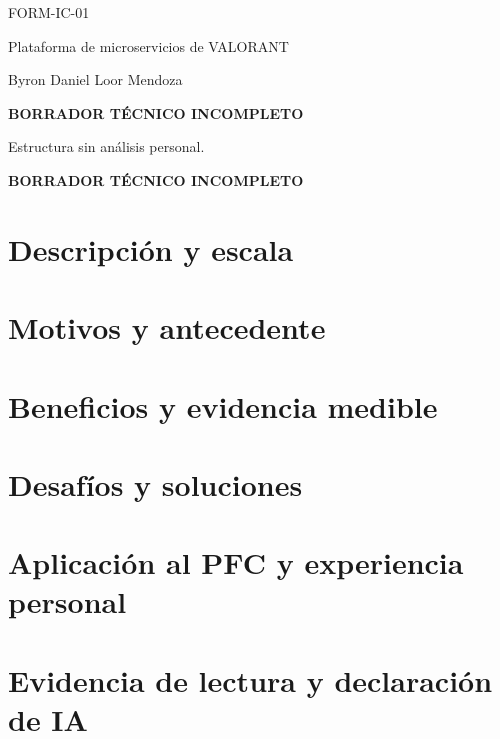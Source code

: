 \documentclass[11pt,a4paper]{article}
\begin{document}
\begin{titlepage}
\centering
{\Large FORM-IC-01\par}
\vspace{1cm}
{\LARGE Plataforma de microservicios de VALORANT\par}
\vspace{1cm}
{\large Byron Daniel Loor Mendoza\par}
\vfill
\textbf{BORRADOR TÉCNICO INCOMPLETO}\par
Estructura sin análisis personal.
\end{titlepage}
\textbf{BORRADOR TÉCNICO INCOMPLETO}
\section*{Descripción y escala}
\section*{Motivos y antecedente}
\section*{Beneficios y evidencia medible}
\section*{Desafíos y soluciones}
\section*{Aplicación al PFC y experiencia personal}
\section*{Evidencia de lectura y declaración de IA}
\clearpage
\end{document}
